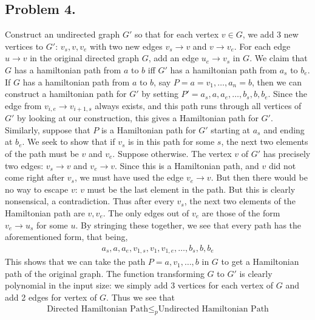 \documentclass[12pt]{article}
\theoremstyle{definitionstyle}
\begin{document}
    \subsection*{Problem 4.}
    Construct an undirected graph $G'$ so that for each vertex $v \in G$, we add 3 new vertices to $G'$: $v_s, v, v_e$ with two new edges $v_s \to v$ and $v \to v_e$. For each edge $u \to v$ in the original directed graph $G$, add an edge $u_e \to v_s$ in $G$. We claim that $G$ has a hamiltonian path from $a$ to $b$ iff $G'$ has a hamiltonian path from $a_s$ to $b_e$. If $G$ has a hamiltonian path from $a$ to $b$, say $P = a=v_1, \ldots, a_n=b$, then we can construct a hamiltonian path for $G'$ by setting $P' = a_s, a, a_e, \ldots, b_s, b, b_e$. Since the edge from $v_{i, e} \to v_{i+1, s}$ always exists, and this path runs through all vertices of $G'$ by looking at our construction, this gives a Hamiltonian path for $G'$. Similarly, suppose that $P$ is a Hamiltonian path for $G'$ starting at $a_s$ and ending at $b_e$. We seek to show that if $v_s$ is in this path for some $s$, the next two elements of the path must be $v$ and $v_e$. Suppose otherwise. The vertex $v$ of $G'$ has precisely two edges: $v_s \to v$ and $v_e \to v$. Since this is a Hamiltonian path, and $v$ did not come right after $v_s$, we must have used the edge $v_e \to v$. But then there would be no way to escape $v$: $v$ must be the last element in the path. But this is clearly nonsensical, a contradiction. Thus after every $v_s$, the next two elements of the Hamiltonian path are $v, v_e$. The only edges out of $v_e$ are those of the form $v_e \to u_s$ for some $u$. By stringing these together, we see that every path has the aforementioned form, that being,
    \begin{align*}
        a_s, a, a_e, v_{1, s}, v_{1}, v_{1, e}, \ldots, b_s, b, b_e
    \end{align*}
    This shows that we can take the path $P = a, v_1, \ldots, b$ in $G$ to get a Hamiltonian path of the original graph. The function transforming $G$ to $G'$ is clearly polynomial in the input size: we simply add 3 vertices for each vertex of $G$ and add 2 edges for vertex of $G$. Thus we see that 
    \begin{align*}
        \text{Directed Hamiltonian Path} \leq_p \text{Undirected Hamiltonian Path}
    \end{align*}
\end{document}
